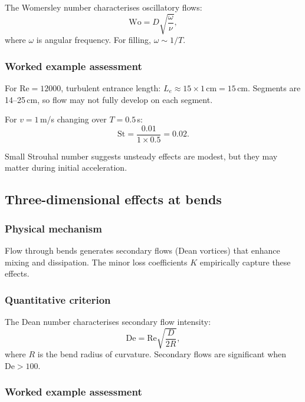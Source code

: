 \documentclass[11pt]{article}
\begin{document}
The Womersley number characterises oscillatory flows:
\begin{equation}
  \text{Wo} = D\sqrt{\frac{\omega}{\nu}},
  \label{eq:womersley}
\end{equation}
where $\omega$ is angular frequency. For filling, $\omega \sim 1/T$.

\subsubsection{Worked example assessment}

For $\text{Re} = 12000$, turbulent entrance length: $L_e \approx 15 \times 1\,\text{cm} = 15$\,cm. Segments are 14--25\,cm, so flow may not fully develop on each segment.

For $v = 1$\,m/s changing over $T = 0.5$\,s:
\[
  \text{St} = \frac{0.01}{1 \times 0.5} = 0.02.
\]

Small Strouhal number suggests unsteady effects are modest, but they may matter during initial acceleration.

\subsection{Three-dimensional effects at bends}

\subsubsection{Physical mechanism}

Flow through bends generates secondary flows (Dean vortices) that enhance mixing and dissipation. The minor loss coefficients $K$ empirically capture these effects.

\subsubsection{Quantitative criterion}

The Dean number characterises secondary flow intensity:
\begin{equation}
  \text{De} = \text{Re}\sqrt{\frac{D}{2R}},
  \label{eq:dean}
\end{equation}
where $R$ is the bend radius of curvature. Secondary flows are significant when $\text{De} > 100$.

\subsubsection{Worked example assessment}
\end{document}
